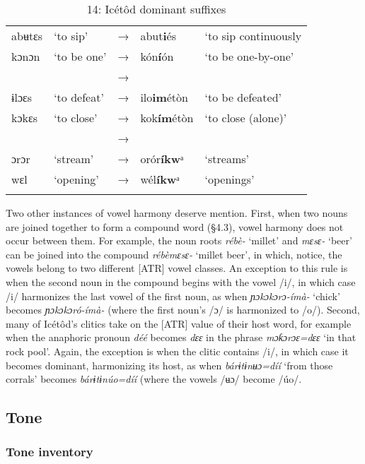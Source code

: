 \begin{table}
\caption{14: Icétôd dominant suffixes}
\label{tab:2}


\begin{tabularx}{\textwidth}{XXXXX}
\lsptoprule

abʉtɛs & ‘to sip’ & → & abut\textbf{i}és & ‘to sip continuously\\
kɔnɔn & ‘to be one’ & → & kón\textbf{í}ón & ‘to be one-by-one’\\
&  & → &  & \\
ɨlɔɛs & ‘to defeat’ & → & ilo\textbf{im}étòn & ‘to be defeated’\\
kɔkɛs & ‘to close’ & → & kok\textbf{ím}étòn & ‘to close (alone)’\\
&  & → &  & \\
ɔrɔr & ‘stream’ & → & orór\textbf{íkw}ᵃ & ‘streams’\\
wɛl & ‘opening’ & → & wél\textbf{íkw}ᵃ & ‘openings’\\
\lspbottomrule
\end{tabularx}
\end{table}
Two other instances of vowel harmony deserve mention. First, when two nouns are joined together to form a compound word (§4.3), vowel harmony does not occur between them. For example, the noun roots \textit{rébè-} ‘millet’ and \textit{mɛsɛ-} ‘beer’ can be joined into the compound \textit{rébèmɛsɛ-} ‘millet beer’, in which, notice, the vowels belong to two different [ATR] vowel classes. An exception to this rule is when the second noun in the compound begins with the vowel /i/, in which case /i/ harmonizes the last vowel of the first noun, as when \textit{ɲɔkɔkɔrɔ-ímà-} ‘chick’ becomes \textit{ɲɔkɔkɔró-ímà-} (where the first noun’s /ɔ/ is harmonized to /o/). Second, many of Icétôd’s clitics take on the [ATR] value of their host word, for example when the anaphoric\textsc{} pronoun \textit{déé} becomes \textit{dɛɛ} in the phrase \textit{mɔƙɔrɔɛ=dɛɛ} ‘in that rock pool’. Again, the exception is when the clitic contains /i/, in which case it becomes dominant, harmonizing its host, as when \textit{bárɨtɨnʉɔ=díí} ‘from those corrals’ becomes \textit{bárɨtɨnúo=díí} (where the vowels /ʉɔ/ become /úo/.
 
\subsection{Tone}
\subsubsection{Tone inventory}

